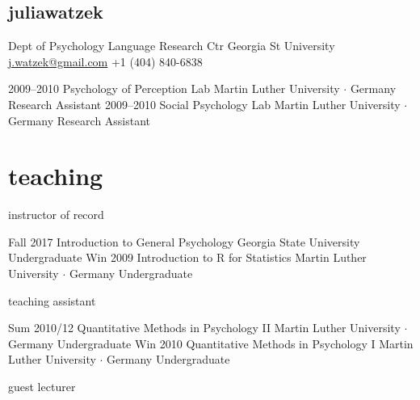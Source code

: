 \documentclass[]{friggeri-cv}
\begin{document}

\newpage
\thispagestyle{fancy}

\begin{aside}
  \section{{\normalfont julia}watzek}
    Dept of Psychology
    Language Research Ctr
    Georgia St University
    ~
    \href{mailto:j.watzek@gmail.com}{j.watzek@gmail.com}
    +1 (404) 840-6838
\end{aside}

\begin{entrylist}
  \entry
    {2009--2010}
    {Psychology of Perception Lab}
    {Martin Luther University $\cdot$ Germany}
    {Research Assistant}
  \entry
    {2009--2010}
    {Social Psychology Lab}
    {Martin Luther University $\cdot$ Germany}
    {Research Assistant}
\end{entrylist}


\section{teaching}


{\subfont\large{} instructor of record}

\begin{entrylist}
  \entry
    {Fall 2017}
    {Introduction to General Psychology}
    {Georgia State University}
    {Undergraduate}
  \entry
    {Win 2009}
    {Introduction to R for Statistics}
    {Martin Luther University $\cdot$ Germany}
    {Undergraduate}
\end{entrylist}

{\subfont\large{} teaching assistant}

\begin{entrylist}
  \entry
    {Sum 2010/12}
    {Quantitative Methods in Psychology II}
    {Martin Luther University $\cdot$ Germany}
    {Undergraduate}
  \entry
    {Win 2010}
    {Quantitative Methods in Psychology I}
    {Martin Luther University $\cdot$ Germany}
    {Undergraduate}
\end{entrylist}

{\subfont\large{} guest lecturer}
\end{document}
